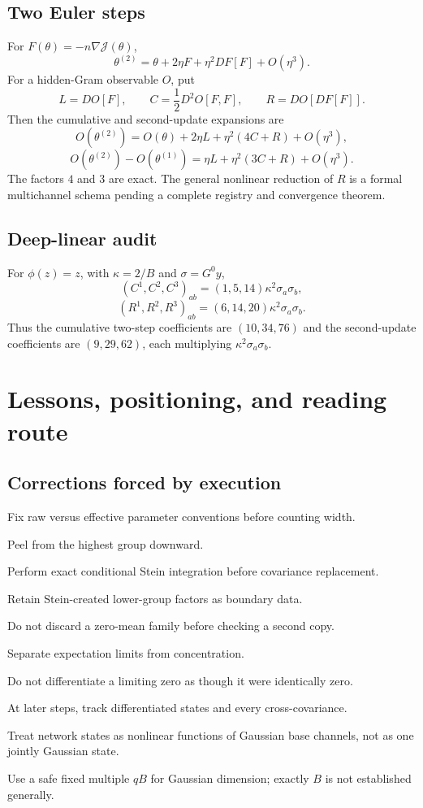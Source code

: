 \documentclass[9pt,oneside]{extreport}
\begin{document}
\section{Two Euler steps}

For $F(\theta)=-n\nabla\mathcal J(\theta)$,
\[
\theta^{(2)}
=\theta+2\eta F+\eta^2DF[F]+O(\eta^3).
\]
For a hidden-Gram observable $O$, put
\[
L=DO[F],\qquad
C=\frac12D^2O[F,F],\qquad
R=DO[DF[F]].
\]
Then the cumulative and second-update expansions are
\[
O(\theta^{(2)})
=O(\theta)+2\eta L+\eta^2(4C+R)+O(\eta^3),
\]
\[
O(\theta^{(2)})-O(\theta^{(1)})
=\eta L+\eta^2(3C+R)+O(\eta^3).
\]
The factors $4$ and $3$ are exact.  The general nonlinear reduction of $R$
is a formal multichannel schema pending a complete registry and convergence
theorem.

\section{Deep-linear audit}

For $\phi(z)=z$, with $\kappa=2/B$ and $\sigma=G^0y$,
\[
(C^1,C^2,C^3)_{ab}
=(1,5,14)\kappa^2\sigma_a\sigma_b,
\]
\[
(R^1,R^2,R^3)_{ab}
=(6,14,20)\kappa^2\sigma_a\sigma_b.
\]
Thus the cumulative two-step coefficients are $(10,34,76)$ and the
second-update coefficients are $(9,29,62)$, each multiplying
$\kappa^2\sigma_a\sigma_b$.

\chapter{Lessons, positioning, and reading route}

\section{Corrections forced by execution}

\begin{compactenum}
\item Fix raw versus effective parameter conventions before counting width.
\item Peel from the highest group downward.
\item Perform exact conditional Stein integration before covariance
replacement.
\item Retain Stein-created lower-group factors as boundary data.
\item Do not discard a zero-mean family before checking a second copy.
\item Separate expectation limits from concentration.
\item Do not differentiate a limiting zero as though it were identically zero.
\item At later steps, track differentiated states and every cross-covariance.
\item Treat network states as nonlinear functions of Gaussian base channels,
not as one jointly Gaussian state.
\item Use a safe fixed multiple $qB$ for Gaussian dimension; exactly $B$ is
not established generally.
\end{compactenum}
\end{document}
